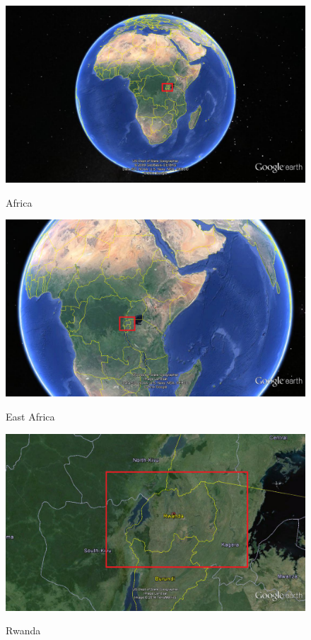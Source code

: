 \cite{countries:dhis2org}
\cite{internet:stats}

\begin{figure}
\centering
\includegraphics[width=\columnwidth]{context/img/africa}
\label{fig:africa}
\caption{Africa}
\end{figure}

\begin{figure}
\centering
\includegraphics[width=\columnwidth]{context/img/eastAfrica}
\label{fig:east_africa}
\caption{East Africa}
\end{figure}

\begin{figure}
\centering
\includegraphics[width=\columnwidth]{context/img/rwanda}
\label{fig:rwanda}
\caption{Rwanda}
\end{figure}

